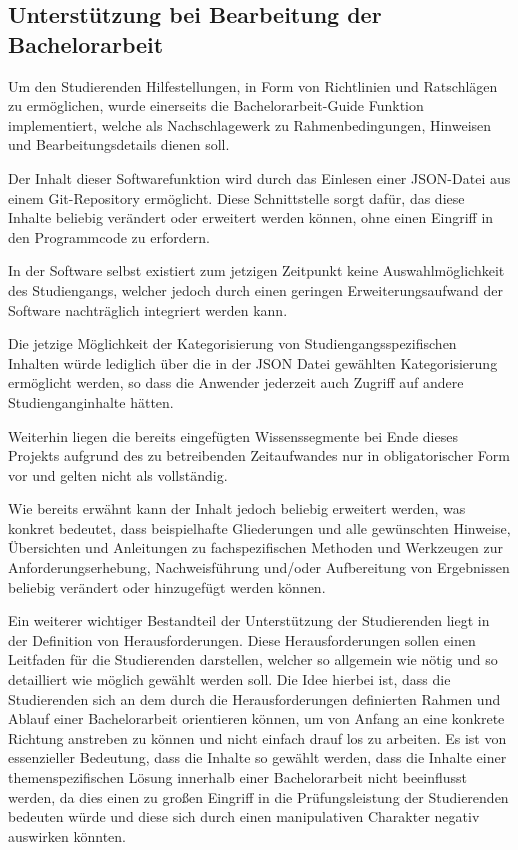\documentclass[bibliography=totoc,listof=totoc,BCOR=5mm,DIV=12,oneside]{scrbook}
\begin{document}
\subsection{Unterstützung bei Bearbeitung der Bachelorarbeit}
\par Um den Studierenden Hilfestellungen, in Form von Richtlinien und Ratschlägen zu ermöglichen, wurde einerseits die Bachelorarbeit-Guide Funktion implementiert, welche als Nachschlagewerk zu Rahmenbedingungen, Hinweisen und Bearbeitungsdetails dienen soll. 
\par Der Inhalt dieser Softwarefunktion wird durch das Einlesen einer JSON-Datei aus einem Git-Repository ermöglicht. Diese Schnittstelle sorgt dafür, das diese Inhalte beliebig verändert oder erweitert werden können, ohne einen Eingriff in den Programmcode zu erfordern.
\par \bigskip In der Software selbst existiert zum jetzigen Zeitpunkt keine Auswahlmöglichkeit des Studiengangs, welcher jedoch durch einen geringen Erweiterungsaufwand der Software nachträglich integriert werden kann.
\par Die jetzige Möglichkeit der Kategorisierung von Studiengangsspezifischen Inhalten würde lediglich über die in der JSON Datei gewählten Kategorisierung ermöglicht werden, so dass die Anwender jederzeit auch Zugriff auf andere Studienganginhalte hätten.
\par Weiterhin liegen die bereits eingefügten Wissenssegmente bei Ende dieses Projekts aufgrund des zu betreibenden Zeitaufwandes nur in obligatorischer Form vor und gelten nicht als vollständig.
\par Wie bereits erwähnt kann der Inhalt jedoch beliebig erweitert werden, was konkret bedeutet, dass  beispielhafte Gliederungen und alle gewünschten Hinweise, Übersichten und Anleitungen zu fachspezifischen Methoden und Werkzeugen zur Anforderungserhebung, Nachweisführung und/oder Aufbereitung von Ergebnissen beliebig verändert oder hinzugefügt werden können.
\par \bigskip Ein weiterer wichtiger Bestandteil der Unterstützung der Studierenden liegt in der Definition von Herausforderungen. Diese Herausforderungen sollen einen Leitfaden für die Studierenden darstellen, welcher so allgemein wie nötig und so detailliert wie möglich gewählt werden soll. Die Idee hierbei ist, dass die Studierenden sich an dem durch die Herausforderungen definierten Rahmen und Ablauf einer Bachelorarbeit orientieren können, um von Anfang an eine konkrete Richtung anstreben zu können und nicht \grqq einfach drauf los zu arbeiten\grqq. Es ist von essenzieller Bedeutung, dass die Inhalte so gewählt werden, dass  die Inhalte einer themenspezifischen Lösung innerhalb einer Bachelorarbeit nicht beeinflusst werden, da dies einen zu großen Eingriff in die Prüfungsleistung der Studierenden bedeuten würde und diese sich durch einen manipulativen Charakter negativ auswirken könnten.
\end{document}
